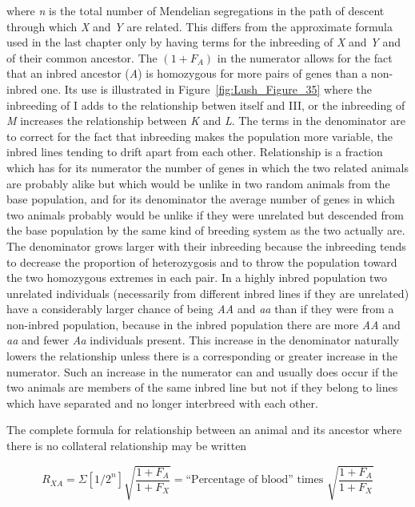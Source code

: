 \noindent
where \textit{n} is the total number of Mendelian segregations in the path of
descent through which \textit{X} and \textit{Y} are related. This differs from the
approximate formula used in the last chapter only by having terms for
the inbreeding of \textit{X} and \textit{Y} and of their common ancestor. The $(1 + F_A)$
in the numerator allows for the fact that an inbred ancestor (\textit{A}) is
homozygous for more pairs of genes than a non-inbred one. Its use is
illustrated in Figure~\ref{fig:Lush_Figure_35} where the inbreeding of I adds to the relationship
betwen itself and III, or the inbreeding of \textit{M} increases the relationship
between \textit{K} and \textit{L}. The terms in the denominator are to correct for
the fact that inbreeding makes the population more variable, the inbred
lines tending to drift apart from each other. Relationship is a fraction
which has for its numerator the number of genes in which the two
related animals are probably alike but which would be unlike in two
random animals from the base population, and for its denominator the
average number of genes in which two animals probably would be
unlike if they were unrelated but descended from the base population
by the same kind of breeding system as the two actually are. The
denominator grows larger with their inbreeding because the inbreeding
tends to decrease the proportion of heterozygosis and to throw the
population toward the two homozygous extremes in each pair. In a
highly inbred population two unrelated individuals (necessarily from
different inbred lines if they are unrelated) have a considerably larger
chance of being \textit{AA} and \textit{aa} than if they were from a non-inbred population,
because in the inbred population there are more \textit{AA} and \textit{aa} and
fewer \textit{Aa} individuals present. This increase in the denominator naturally
lowers the relationship unless there is a corresponding or greater
increase in the numerator. Such an increase in the numerator can and
usually does occur if the two animals are members of the same inbred
line but not if they belong to lines which have separated and no longer
interbreed with each other.

The complete formula for relationship between an animal and its
ancestor where there is no collateral relationship may be written

\[ R_{XA} = \Sigma[{1/2}^n]\sqrt{\frac{1 + F_A}{1 + F_X}} = \text{``Percentage of blood'' times }\sqrt{\frac{1 + F_A}{1 + F_X}} \]

